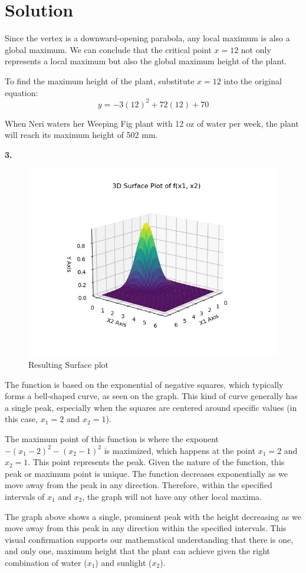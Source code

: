\documentclass{harvardml}
\theoremstyle{definition}
\theoremstyle{plain}
\newenvironment{solution}
  {\color{blue}\section*{Solution}}
{}
\begin{document}
\begin{solution}
\medskip
Since the vertex is a downward-opening parabola, any local maximum is also a global maximum.
We can conclude that the critical point \( x = 12 \) not only represents a local maximum but also the global maximum height of the plant.

\medskip
To find the maximum height of the plant, substitute \( x = 12 \) into the original equation:
     \[ y = -3(12)^2 + 72(12) + 70 \]

When Neri waters her Weeping Fig plant with 12 oz of water per week, the plant will reach its maximum height of 502 mm.

\bigskip
\noindent \textbf{3.}

\begin{figure}[h]
    \centering
    \includegraphics[width=0.75\linewidth]{Figure_2.png}
    \caption{Resulting Surface plot}
    \label{fig:enter-label}
\end{figure}

The function is based on the exponential of negative squares, which typically forms a bell-shaped curve, as seen on the graph. This kind of curve generally has a single peak, especially when the squares are centered around specific values (in this case, \(x_1 = 2\) and \(x_2 = 1\)).

\medskip
The maximum point of this function is where the exponent \( -\left(x_1 - 2\right)^2 - \left(x_2 - 1\right)^2 \) is maximized, which happens at the point \(x_1 = 2\) and \(x_2 = 1\). This point represents the peak. Given the nature of the function, this peak or maximum point is unique. The function decreases exponentially as we move away from the peak in any direction. Therefore, within the specified intervals of \(x_1\) and \(x_2\), the graph will not have any other local maxima.

\medskip
The graph above shows a single, prominent peak with the height decreasing as we move away from this peak in any direction within the specified intervals. This visual confirmation supports our mathematical understanding that there is one, and only one, maximum height that the plant can achieve given the right combination of water (\(x_1\)) and sunlight (\(x_2\)).
\end{solution}
\end{document}
